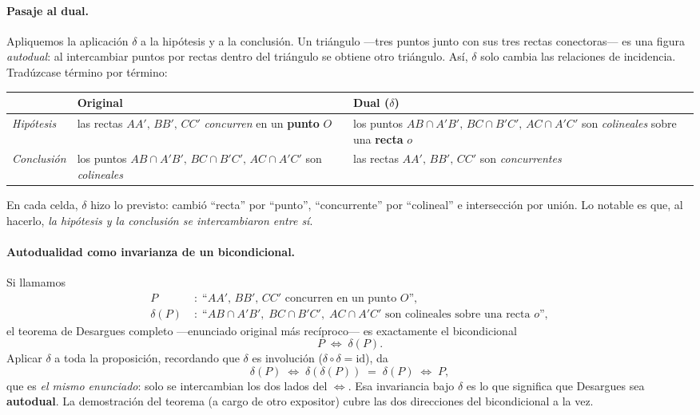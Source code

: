\documentclass[11pt,a4paper]{article}
\begin{document}
\paragraph{Pasaje al dual.}
Apliquemos la aplicación $\delta$ a la hipótesis y a la conclusión. Un
triángulo —tres puntos junto con sus tres rectas conectoras— es una figura
\emph{autodual}: al intercambiar puntos por rectas dentro del triángulo
se obtiene otro triángulo. Así, $\delta$ solo cambia las relaciones de
incidencia. Tradúzcase término por término:

\begin{center}
\renewcommand{\arraystretch}{1.4}
\begin{tabular}{@{}p{}p{}p{}@{}}
\toprule
 & \textbf{Original} & \textbf{Dual ($\delta$)} \\
\midrule
\textit{Hipótesis} &
las rectas $AA',\,BB',\,CC'$ \emph{concurren} en un \textbf{punto} $O$ &
los puntos $AB\cap A'B',\,BC\cap B'C',\,AC\cap A'C'$ son \emph{colineales} sobre una \textbf{recta} $o$ \\
\textit{Conclusión} &
los puntos $AB\cap A'B',\,BC\cap B'C',\,AC\cap A'C'$ son \emph{colineales} &
las rectas $AA',\,BB',\,CC'$ son \emph{concurrentes} \\
\bottomrule
\end{tabular}
\end{center}

\noindent En cada celda, $\delta$ hizo lo previsto: cambió ``recta'' por
``punto'', ``concurrente'' por ``colineal'' e intersección por unión.
Lo notable es que, al hacerlo, \emph{la hipótesis y la conclusión se
intercambiaron entre sí}.

\paragraph{Autodualidad como invarianza de un bicondicional.}
Si llamamos
\begin{align*}
  P\;&:\;\text{``$AA',\,BB',\,CC'$ concurren en un punto $O$''},\\
  \delta(P)\;&:\;\text{``$AB\!\cap\! A'B',\;BC\!\cap\! B'C',\;AC\!\cap\! A'C'$ son colineales sobre una recta $o$''},
\end{align*}
el teorema de Desargues completo —enunciado original más recíproco— es
exactamente el bicondicional
\[
  P \;\Longleftrightarrow\; \delta(P).
\]
Aplicar $\delta$ a toda la proposición, recordando que $\delta$ es
involución ($\delta\circ\delta=\mathrm{id}$), da
\[
  \delta(P) \;\Longleftrightarrow\; \delta(\delta(P))
  \;=\;
  \delta(P) \;\Longleftrightarrow\; P,
\]
que es \emph{el mismo enunciado}: solo se intercambian los dos lados del
$\Longleftrightarrow$. Esa invariancia bajo $\delta$ es lo que significa
que Desargues sea \textbf{autodual}. La demostración del teorema (a cargo
de otro expositor) cubre las dos direcciones del bicondicional a la vez.
\end{document}
